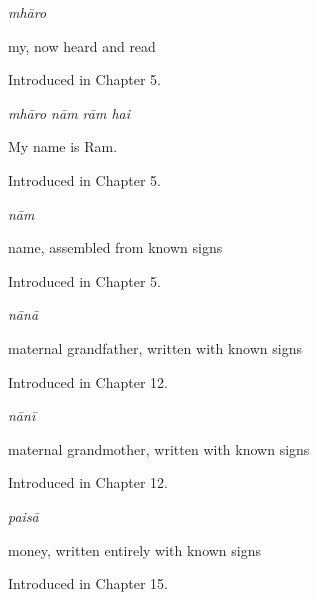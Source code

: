 \noindent\begin{minipage}[t]{\linewidth}
\raggedright
\textbf{}\enspace\emph{mhāro}\par
\small my, now heard and read\par
\footnotesize Introduced in Chapter 5.
\end{minipage}\par\medskip

\noindent\begin{minipage}[t]{\linewidth}
\raggedright
\textbf{   }\enspace\emph{mhāro nām rām hai}\par
\small My name is Ram.\par
\footnotesize Introduced in Chapter 5.
\end{minipage}\par\medskip

\noindent\begin{minipage}[t]{\linewidth}
\raggedright
\textbf{}\enspace\emph{nām}\par
\small name, assembled from known signs\par
\footnotesize Introduced in Chapter 5.
\end{minipage}\par\medskip

\noindent\begin{minipage}[t]{\linewidth}
\raggedright
\textbf{}\enspace\emph{nānā}\par
\small maternal grandfather, written with known signs\par
\footnotesize Introduced in Chapter 12.
\end{minipage}\par\medskip

\noindent\begin{minipage}[t]{\linewidth}
\raggedright
\textbf{}\enspace\emph{nānī}\par
\small maternal grandmother, written with known signs\par
\footnotesize Introduced in Chapter 12.
\end{minipage}\par\medskip

\noindent\begin{minipage}[t]{\linewidth}
\raggedright
\textbf{}\enspace\emph{paisā}\par
\small money, written entirely with known signs\par
\footnotesize Introduced in Chapter 15.
\end{minipage}\par\medskip

